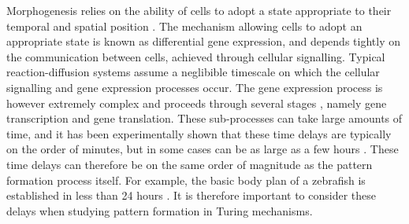 \documentclass[12pt]{report}
\begin{document}
Morphogenesis relies on the ability of cells to adopt a state appropriate to their temporal and spatial position \cite{gaffmonk}. The mechanism allowing cells to adopt an appropriate state is known as differential gene expression, and depends tightly on the communication between cells, achieved through cellular signalling. Typical reaction-diffusion systems assume a neglibible timescale on which the cellular signalling and gene expression processes occur. The gene expression process is however extremely complex and proceeds through several stages \cite{gaffmonk}, namely gene transcription and gene translation. These sub-processes can take large amounts of time, and it has been experimentally shown that these time delays are typically on the order of minutes, but in some cases can be as large as a few hours \cite{gaffmonk,tennyson}. These time delays can therefore be on the same order of magnitude as the pattern formation process itself. For example, the basic body plan of a zebrafish is established in less than 24 hours \cite{gaffmonk,kimmel}. It is therefore important to consider these delays when studying pattern formation in Turing mechanisms.
\\
\end{document}
